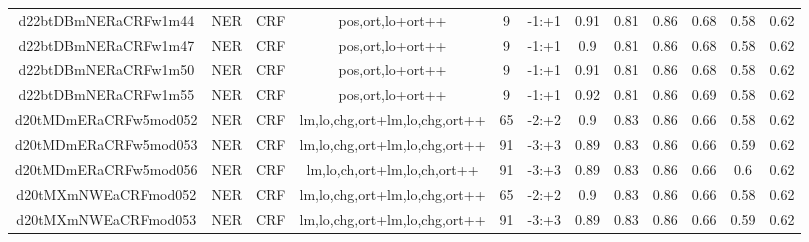 \documentclass[a4paper]{article}
\begin{document}
\begin{landscape}
\begin{center}
\begin{tabular}{ |c|c|c|c|c|c|c|c|c|c|c|c|}
 	
 
 	
 		
 		\small{ d22btDBmNERaCRFw1m44 } & NER & CRF & pos,ort,lo+ort++  &  9 &  -1:+1  &  0.91 & 0.81 & 0.86  &  0.68 & 0.58 & 0.62 \\
 		

 	
 
 	
 		
 		\small{ d22btDBmNERaCRFw1m47 } & NER & CRF & pos,ort,lo+ort++  &  9 &  -1:+1  &  0.9 & 0.81 & 0.86  &  0.68 & 0.58 & 0.62 \\
 		

 	
 
 	
 		
 		\small{ d22btDBmNERaCRFw1m50 } & NER & CRF & pos,ort,lo+ort++  &  9 &  -1:+1  &  0.91 & 0.81 & 0.86  &  0.68 & 0.58 & 0.62 \\
 		

 	
 
 	
 		
 		\small{ d22btDBmNERaCRFw1m55 } & NER & CRF & pos,ort,lo+ort++  &  9 &  -1:+1  &  0.92 & 0.81 & 0.86  &  0.69 & 0.58 & 0.62 \\
 		

 	
 
 	
 		
 		\small{ d20tMDmERaCRFw5mod052 } & NER & CRF & lm,lo,chg,ort+lm,lo,chg,ort++  &  65 &  -2:+2  &  0.9 & 0.83 & 0.86  &  0.66 & 0.58 & 0.62 \\
 		

 	
 
 	
 		
 		\small{ d20tMDmERaCRFw5mod053 } & NER & CRF & lm,lo,chg,ort+lm,lo,chg,ort++  &  91 &  -3:+3  &  0.89 & 0.83 & 0.86  &  0.66 & 0.59 & 0.62 \\
 		

 	
 
 	
 		
 		\small{ d20tMDmERaCRFw5mod056 } & NER & CRF & lm,lo,ch,ort+lm,lo,ch,ort++  &  91 &  -3:+3  &  0.89 & 0.83 & 0.86  &  0.66 & 0.6 & 0.62 \\
 		

 	
 
 	
 		
 		\small{ d20tMXmNWEaCRFmod052 } & NER & CRF & lm,lo,chg,ort+lm,lo,chg,ort++  &  65 &  -2:+2  &  0.9 & 0.83 & 0.86  &  0.66 & 0.58 & 0.62 \\
 		

 	
 
 	
 		
 		\small{ d20tMXmNWEaCRFmod053 } & NER & CRF & lm,lo,chg,ort+lm,lo,chg,ort++  &  91 &  -3:+3  &  0.89 & 0.83 & 0.86  &  0.66 & 0.59 & 0.62 \\
 		


\end{tabular}
\end{center}
\end{landscape}
\end{document}

